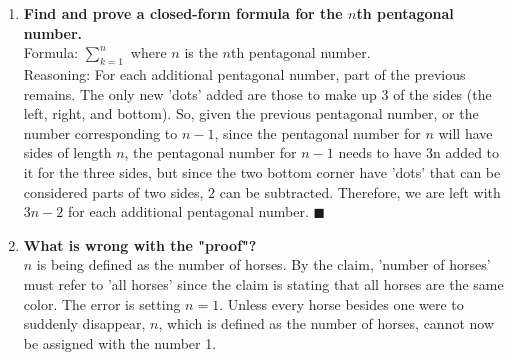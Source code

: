 \documentclass{article}
\begin{document}
\begin{enumerate}
\item \textbf{Find and prove a closed-form formula for the $n$th pentagonal number.} \\
Formula: $\sum_{k=1}^{n}$ where $n$ is the $n$th pentagonal number. \\
Reasoning: For each additional pentagonal number, part of the previous remains. The only new 'dots' added are those to make up 3 of the sides (the left, right, and bottom). So, given the previous pentagonal number, or the number corresponding to $n-1$, since the pentagonal number for $n$ will have sides of length $n$, the pentagonal number for $n-1$ needs to have 3n added to it for the three sides, but since the two bottom corner have 'dots' that can be considered parts of two sides, $2$ can be subtracted. Therefore, we are left with $3n-2$ for each additional pentagonal number. $\blacksquare$ \\

\item \textbf{What is wrong with the "proof"?} \\
$n$ is being defined as the number of horses. By the claim, 'number of horses' must refer to 'all horses' since the claim is stating that all horses are the same color. The error is setting $n=1$. Unless every horse besides one were to suddenly disappear, $n$, which is defined as the number of horses, cannot now be assigned with the number 1.


\end{enumerate}
\end{document}
